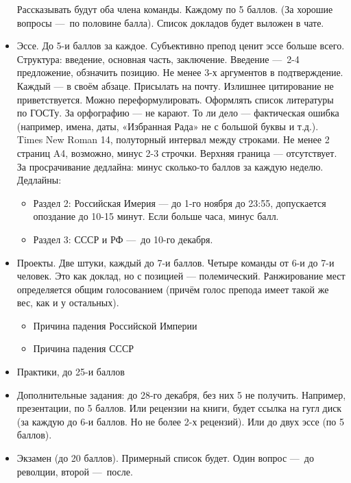 \documentclass[12pt, a4paper]{article}
\begin{document}
\begin{itemize}
        Рассказывать будут оба члена команды. Каждому по 5 баллов. (За хорошие вопросы — по половине балла). 
        Список докладов будет выложен в чате.
        \item Эссе. До 5-и баллов за каждое. Субъективно препод ценит эссе больше всего. Структура: введение, основная часть, заключение.
        Введение — 2-4 предложение, обзначить позицию.
        Не менее 3-х аргументов в подтверждение. Каждый — в своём абзаце. Присылать на почту. 
        Излишнее цитирование не приветствуется. Можно переформулировать.
        Оформлять список литературы по ГОСТу.
        За орфографию — не карают. То ли дело — фактическая ошибка (например, имена, даты, «Избранная Рада» не с большой буквы и т.д.).
        Times New Roman 14, полуторный интервал между строками. Не менее 2 страниц A4, возможно, минус 2-3 строчки. Верхняя граница — отсутствует. 
        За просрачивание дедлайна: минус сколько-то баллов за каждую неделю. Дедлайны:
        \begin{itemize}
            \item Раздел 2: Российская Имерия — до 1-го ноября до 23:55, допускается опоздание до 10-15 минут. Если больше часа, минус балл.
            \item Раздел 3: СССР и РФ — до 10-го декабря.
        \end{itemize}
        \item Проекты. Две штуки, каждый до 7-и баллов.
        Четыре команды от 6-и до 7-и человек.
        Это как доклад, но с позицией — полемический.
        Ранжирование мест определяется общим голосованием (причём голос препода имеет такой же вес, как и у остальных).
        \begin{itemize}
            \item Причина падения Российской Империи
            \item Причина падения СССР
        \end{itemize}
        \item Практики, до 25-и баллов
        \item Дополнительные задания: до 28-го декабря, без них 5 не получить. Например, презентации, по 5 баллов. 
        Или рецензии на книги, будет ссылка на гугл диск (за каждую до 6-и баллов. Но не более 2-х рецензий).
        Или до двух эссе (по 5 баллов).
        \item Экзамен (до 20 баллов). Примерный список будет. Один вопрос — до револции, второй — после.
    \end{itemize}
\end{document}

